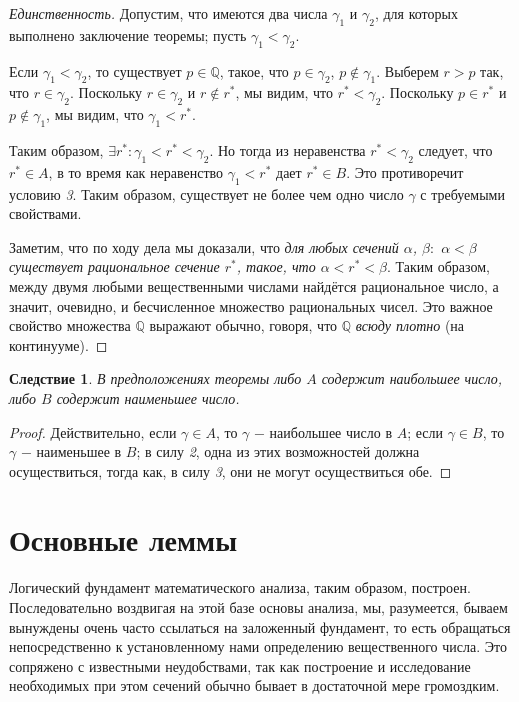 \documentclass{article}
\newtheorem*{consequence}{Следствие}
\begin{document}
\begin{proof}[Единственность]
Допустим, что имеются два числа \(\gamma_1\) и \(\gamma_2\), для которых выполнено заключение теоремы; пусть \(\gamma_1 < \gamma_2\).

Если \(\gamma_1 < \gamma_2\), то существует \(p \in \mathbb{Q}\), такое, что \(p \in \gamma_2\), \(p \notin \gamma_1\). Выберем \(r > p\) так, что \(r \in \gamma_2\). Поскольку \(r \in \gamma_2\) и \(r \notin r^{*}\), мы видим, что \(r^{*} < \gamma_2\). Поскольку \(p \in r^{*}\) и \(p \notin \gamma_1\), мы видим, что \(\gamma_1 < r^{*}\).

Таким образом, \(\exists r^{*} : \gamma_1 < r^{*} < \gamma_2\). Но тогда из неравенства \(r^{*} < \gamma_2\) следует, что \(r^{*} \in A\), в то время как неравенство \(\gamma_1 < r^{*}\) дает \(r^{*} \in B\). Это противоречит условию \textit{3}. Таким образом, существует не более чем одно число \(\gamma\) с требуемыми свойствами.

Заметим, что по ходу дела мы доказали, что \textit{для любых сечений \(\alpha\), \(\beta :\) \(\alpha < \beta\) существует рациональное сечение \(r^{*}\), такое, что \(\alpha < r^{*} < \beta\)}. Таким образом, между двумя любыми вещественными числами найдётся рациональное число, а значит, очевидно, и бесчисленное множество рациональных чисел. Это важное свойство множества \(\mathbb{Q}\) выражают обычно, говоря, что \(\mathbb{Q}\) \textit{всюду плотно} (на континууме).

\end{proof}

\begin{consequence}
В предположениях теоремы либо \(A\) содержит наибольшее число, либо \(B\) содержит наименьшее число.
\end{consequence}

\begin{proof}
Действительно, если \(\gamma \in A\), то \(\gamma\) \(-\) наибольшее число в \(A\); если \(\gamma \in B\), то \(\gamma\) \(-\) наименьшее в \(B\); в силу \textit{2}, одна из этих возможностей должна осуществиться, тогда как, в силу \textit{3}, они не могут осуществиться обе.
\end{proof}

\section{Основные леммы}

Логический фундамент математического анализа, таким образом, построен. Последовательно воздвигая на этой базе основы анализа, мы, разумеется, бываем вынуждены очень часто ссылаться на заложенный фундамент, то есть обращаться непосредственно к установленному нами определению вещественного числа. Это сопряжено с известными неудобствами, так как построение и исследование необходимых при этом сечений обычно бывает в достаточной мере громоздким.
\end{document}
